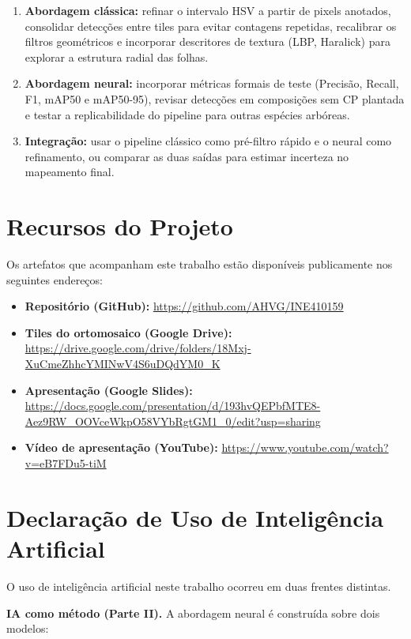 \documentclass[12pt, a4paper]{article}
\begin{document}
\begin{enumerate}
    \item \textbf{Abordagem clássica:} refinar o intervalo HSV a partir de pixels
    anotados, consolidar detecções entre tiles para evitar contagens repetidas,
    recalibrar os filtros geométricos e incorporar descritores de textura (LBP,
    Haralick) para explorar a estrutura radial das folhas.
    \item \textbf{Abordagem neural:} incorporar métricas formais de teste
    (Precisão, Recall, F1, mAP50 e mAP50-95), revisar detecções em composições sem
    CP plantada e testar a replicabilidade do pipeline para outras espécies
    arbóreas.
    \item \textbf{Integração:} usar o pipeline clássico como pré-filtro rápido e o
    neural como refinamento, ou comparar as duas saídas para estimar incerteza no
    mapeamento final.
\end{enumerate}

\section{Recursos do Projeto}

Os artefatos que acompanham este trabalho estão disponíveis publicamente nos
seguintes endereços:

\begin{itemize}
    \item \textbf{Repositório (GitHub):}
    \url{https://github.com/AHVG/INE410159}
    \item \textbf{Tiles do ortomosaico (Google Drive):}
    \url{https://drive.google.com/drive/folders/18Mxj-XuCmeZhhcYMINwV4S6uDQdYM0_K}
    \item \textbf{Apresentação (Google Slides):}
    \url{https://docs.google.com/presentation/d/193hvQEPbfMTE8-Aez9RW_OOVceWkpO58VYbRgtGM1_0/edit?usp=sharing}
    \item \textbf{Vídeo de apresentação (YouTube):}
    \url{https://www.youtube.com/watch?v=eB7FDu5-tiM}
\end{itemize}

\section{Declaração de Uso de Inteligência Artificial}

O uso de inteligência artificial neste trabalho ocorreu em duas frentes distintas.

\textbf{IA como método (Parte II).} A abordagem neural é construída sobre dois
modelos:
\end{document}
